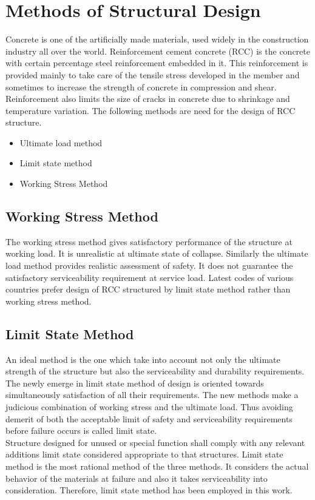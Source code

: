 \chapter{Methods of Structural Design}
Concrete is one of the artificially made materials, used widely in the construction industry all over the world. Reinforcement cement concrete (RCC) is the concrete with certain percentage steel reinforcement embedded in it. This reinforcement is provided mainly to take care of the tensile stress developed in the member and sometimes to increase the strength of concrete in compression and shear. Reinforcement also limits the size of cracks in concrete due to shrinkage and temperature variation.
The following methods are need for the design of RCC structure.
\begin{itemize}
\item	Ultimate load method 
\item	Limit state method
\item Working Stress Method
\end{itemize}

\section{Working Stress Method}
      The working stress method gives satisfactory performance of the structure at working load. It is unrealistic at ultimate state of collapse. Similarly the ultimate load method provides realistic assessment of safety. It does not guarantee the satisfactory serviceability requirement at service load. Latest codes of various countries prefer design of RCC structured by limit state method rather than working stress method.

\section{Limit State Method}
An ideal method is the one which take into account not only the ultimate strength of the structure but also the serviceability and durability requirements. The newly emerge in limit state method of design is oriented towards simultaneously satisfaction of all their requirements. The new methods make a judicious combination of working stress and the ultimate load. Thus avoiding demerit of both the acceptable limit of safety and serviceability requirements before failure occurs is called limit state.\\
	Structure designed for unused or special function shall comply with any relevant additions limit state considered appropriate to that structures. Limit state method is the most rational method of the three methods. It considers the actual behavior of the materials at failure and also it takes serviceability into consideration. Therefore, limit state method has been employed in this work.
